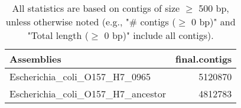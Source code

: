 \documentclass[12pt,a4paper]{article}
\begin{document}
\begin{table}[ht]
\begin{center}
\caption{All statistics are based on contigs of size $\geq$ 500 bp, unless otherwise noted (e.g., "\# contigs ($\geq$ 0 bp)" and "Total length ($\geq$ 0 bp)" include all contigs).}
\begin{tabular}{|l*{1}{|r}|}
\hline
Assemblies & final.contigs \\ \hline
Escherichia\_coli\_O157\_H7\_0965 & 5120870 \\ \hline
Escherichia\_coli\_O157\_H7\_ancestor & 4812783 \\ \hline
\end{tabular}
\end{center}
\end{table}
\end{document}
